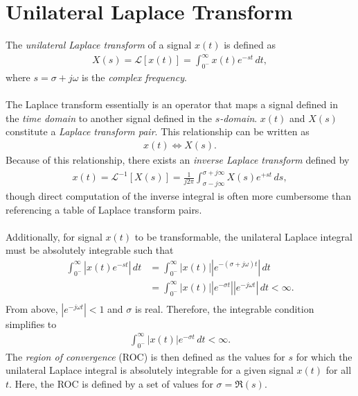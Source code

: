 \documentclass{report}
\begin{document}
\section{Unilateral Laplace Transform}
The \emph{unilateral Laplace transform} of a signal $x(t)$ is defined as  
\begin{align}
    X(s) = \mathcal{L}[x(t)] = \int_{0^-}^{\infty} x(t) e^{-st} \,dt,
\end{align}
where $s=\sigma + j\omega$ is the \emph{complex frequency}. 
\\ \\ 
The Laplace transform essentially is an operator that maps a signal defined in the \emph{time domain} to another signal 
defined in the \emph{$s$-domain}. $x(t)$ and $X(s)$ constitute a \emph{Laplace transform pair}. This relationship can be written as 
\begin{align}
    x(t) \iff X(s).
\end{align}
Because of this relationship, there exists an \emph{inverse Laplace transform} defined by 
\begin{align}
    x(t) = \mathcal{L}^{-1}[X(s)] = \frac{1}{j2\pi}\int_{\sigma-j\infty}^{\sigma+j\infty} X(s) e^{+st} \,ds,
\end{align}
though direct computation of the inverse integral is often more cumbersome than referencing a table of Laplace transform pairs.
\\ \\
Additionally, for signal $x(t)$ to be transformable, the unilateral Laplace integral must be absolutely integrable such that 
\begin{align}
    \int_{0^-}^{\infty} |x(t) e^{-st}| \,dt &= \int_{0^-}^{\infty} |x(t)||e^{-(\sigma+j\omega)t}| \,dt \nonumber \\
    &= \int_{0^-}^{\infty} |x(t)| |e^{-\sigma t}| |e^{-j\omega t}| \,dt < \infty. \\
\end{align}
From above, $|e^{-j\omega t}|<1$ and $\sigma$ is real. Therefore, the integrable condition simplifies to 
\begin{align}
    \int_{0^-}^{\infty} |x(t)| e^{-\sigma t} \,dt < \infty.
\end{align}
The \emph{region of convergence} (ROC) is then defined as the values for $s$ for which the unilateral Laplace integral is absolutely integrable 
for a given signal $x(t)$ for all $t$. Here, the ROC is defined by a set of values for $\sigma = \Re(s)$.
\\ \\
\end{document}

